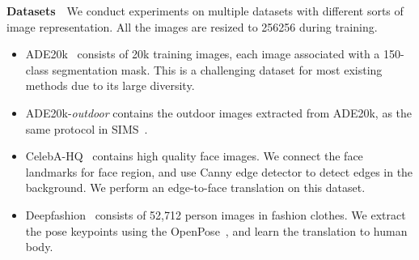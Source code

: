 \documentclass[10pt,twocolumn,letterpaper]{article}
\begin{document}
\noindent\textbf{Datasets}~~We conduct experiments on multiple datasets with different sorts of image representation. All the images are resized to 256256 during training. 
\begin{itemize}[leftmargin=*]
\itemsep0em 
\item {ADE20k}~\cite{zhou2017scene} consists of 20k training images, each image associated with a 150-class segmentation mask. This is a challenging dataset for most existing methods due to its large diversity.
\item {ADE20k-\emph{outdoor}} contains the outdoor images extracted from ADE20k, as the same protocol in SIMS~\cite{qi2018semi}.
\item {CelebA-HQ}~\cite{liu2015faceattributes} contains high quality face images. We connect the face landmarks for face region, and use Canny edge detector to detect edges in the background. We perform an edge-to-face translation on this dataset. 
\item {Deepfashion}~\cite{liuLQWTcvpr16DeepFashion} consists of 52,712 person images in fashion clothes. We extract the pose keypoints using the  OpenPose~\cite{cao2018openpose}, and learn the translation to human body.
\end{itemize}
 
\end{document}
